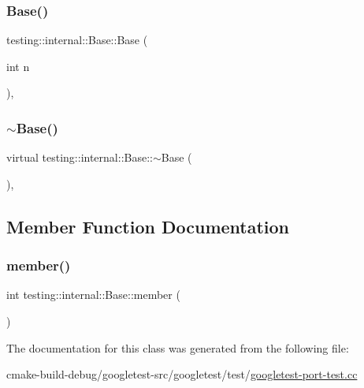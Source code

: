 \subsubsection{\texorpdfstring{Base()}{Base()}\hspace{0.1cm}{\footnotesize\ttfamily [2/2]}}
{\footnotesize\ttfamily testing\+::internal\+::\+Base\+::\+Base (\begin{DoxyParamCaption}\item[{int}]{n }\end{DoxyParamCaption})\hspace{0.3cm}{\ttfamily [inline]}, {\ttfamily [explicit]}}

\mbox{\label{classtesting_1_1internal_1_1Base_afb29c9032fb50cc6520014aad9d68328}} 
\subsubsection{\texorpdfstring{$\sim$Base()}{~Base()}}
{\footnotesize\ttfamily virtual testing\+::internal\+::\+Base\+::$\sim$\+Base (\begin{DoxyParamCaption}{ }\end{DoxyParamCaption})\hspace{0.3cm}{\ttfamily [inline]}, {\ttfamily [virtual]}}



\subsection{Member Function Documentation}
\mbox{\label{classtesting_1_1internal_1_1Base_a7ddba6221b56613be545544b7ef6214c}} 
\subsubsection{\texorpdfstring{member()}{member()}}
{\footnotesize\ttfamily int testing\+::internal\+::\+Base\+::member (\begin{DoxyParamCaption}{ }\end{DoxyParamCaption})\hspace{0.3cm}{\ttfamily [inline]}}



The documentation for this class was generated from the following file\+:\begin{DoxyCompactItemize}
\item 
cmake-\/build-\/debug/googletest-\/src/googletest/test/\mbox{\hyperlink{googletest-port-test_8cc}{googletest-\/port-\/test.\+cc}}\end{DoxyCompactItemize}
